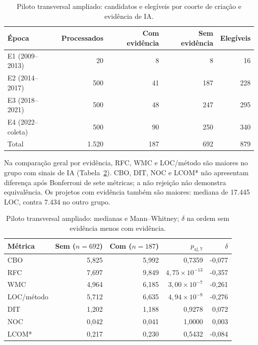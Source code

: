\begin{table}[htbp]
\centering
\caption{Piloto transversal ampliado: candidatos e elegíveis por coorte de criação e evidência de IA.}
\label{tab:ck-ampliado-celulas}
\small
\begin{tabular}{lrrrr}
\hline
Época & Processados & Com evidência & Sem evidência & Elegíveis \\
\hline
E1 (2009--2013) & 20 & 8 & 8 & 16 \\
E2 (2014--2017) & 500 & 41 & 187 & 228 \\
E3 (2018--2021) & 500 & 48 & 247 & 295 \\
E4 (2022--coleta) & 500 & 90 & 250 & 340 \\
\hline
Total & 1.520 & 187 & 692 & 879 \\
\hline
\end{tabular}
\end{table}

Na comparação geral por evidência, RFC, WMC e LOC/método são maiores no grupo com sinais de IA (Tabela~\ref{tab:ck-ampliado-geral}). CBO, DIT, NOC e LCOM* não apresentam diferença após Bonferroni de sete métricas; a não rejeição não demonstra equivalência. Os projetos com evidência também são maiores: mediana de 17.445 LOC, contra 7.434 no outro grupo.

\begin{table}[htbp]
\centering
\caption{Piloto transversal ampliado: medianas e Mann--Whitney; $\delta$ na ordem sem evidência menos com evidência.}
\label{tab:ck-ampliado-geral}
\small
\begin{tabular}{lrrrr}
\hline
Métrica & Sem ($n=692$) & Com ($n=187$) & $p_{\mathrm{aj},7}$ & $\delta$ \\
\hline
CBO & 5,825 & 5,992 & 0,7359 & -0,077 \\
RFC & 7,697 & 9,849 & $4,75\times 10^{-13}$ & -0,357 \\
WMC & 4,964 & 6,185 & $3,00\times 10^{-7}$ & -0,261 \\
LOC/método & 5,712 & 6,635 & $4,94\times 10^{-8}$ & -0,276 \\
DIT & 1,202 & 1,188 & 0,9278 & 0,072 \\
NOC & 0,042 & 0,041 & 1,0000 & 0,003 \\
LCOM* & 0,217 & 0,230 & 0,5432 & -0,084 \\
\hline
\end{tabular}
\end{table}

